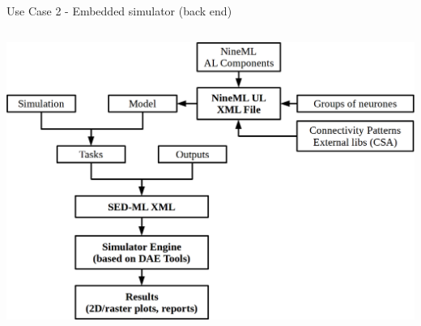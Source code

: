 \documentclass[compress,newPxFont,sthlmFooter]{beamer}
\begin{document}
\begin{frame}[plain]{Use Case 2 - Embedded simulator (back end)}
\begin{columns}[c]
      \begin{column}{0.45\paperwidth}
        \begin{center}
            \includegraphics[align=c, width=\textwidth]{nineml_ris.png}
        \end{center}
      \end{column}
    \end{columns}
\end{frame}
\end{document}
